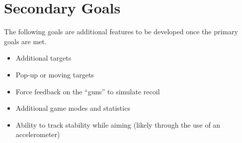 \documentclass{report}
\begin{document}
\section*{Secondary Goals}

The following goals are additional features to be developed once the primary goals are met.

\begin{itemize}
\item Additional targets
\item Pop-up or moving targets
\item Force feedback on the ``guns'' to simulate recoil
\item Additional game modes and statistics
\item Ability to track stability while aiming (likely through the use of an accelerometer)
\end{itemize}
\end{document}
